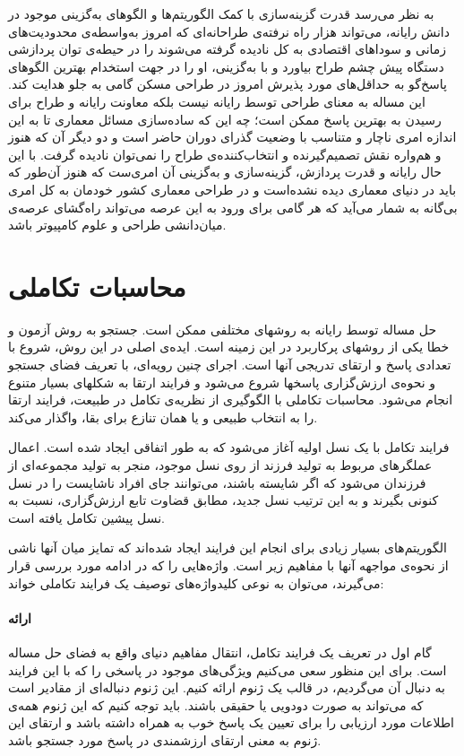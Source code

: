 \documentclass{report}
\begin{document}
به نظر می‌رسد قدرت گزینه‌سازی با کمک الگوریتم‌ها و الگوهای به‌گزینی موجود در دانش رایانه، می‌تواند هزار راه نرفته‌ی طراحانه‌ای که امروز به‌واسطه‌ی محدودیت‌های زمانی و سوداهای اقتصادی به کل نادیده گرفته می‌شوند را در حیطه‌ی توان پردازشی دستگاه پیش چشم طراح بیاورد و با به‌گزینی، او را در جهت استخدام بهترین الگوهای پاسخ‌گو به حداقل‌های مورد پذیرش امروز در طراحی مسکن گامی به جلو هدایت کند. این مساله به معنای طراحی توسط رایانه نیست بلکه معاونت رایانه و طراح برای رسیدن به بهترین پاسخ ممکن است؛ چه این که ساده‌سازی مسائل معماری تا به این اندازه امری ناچار و متناسب با وضعیت گذرای دوران حاضر است و دو دیگر آن که هنوز و هم‌واره نقش تصمیم‌گیرنده و انتخاب‌کننده‌ی طراح را نمی‌توان نادیده گرفت. با این حال رایانه و قدرت پردازش، گزینه‌سازی و به‌گزینی آن امری‌ست که هنوز آن‌طور که باید در دنیای معماری دیده نشده‌است و در طراحی معماری کشور خودمان به کل امری بی‌گانه به شمار می‌آید که هر گامی برای ورود به این عرصه می‌تواند راه‌گشای عرصه‌ی میان‌دانشی طراحی و علوم کامپیوتر باشد.

\section{محاسبات تکاملی}
حل مساله توسط رایانه به روشهای مختلفی ممکن است. جستجو به روش آزمون و خطا یکی از روشهای پرکاربرد در این زمینه است. ایده‌ی اصلی در این روش، شروع با تعدادی پاسخ و ارتقای تدریجی آنها است. اجرای چنین رویه‌ای، با تعریف فضای جستجو و نحوه‌ی ارزش‌گزاری پاسخها شروع می‌شود و فرایند ارتقا به شکلهای بسیار متنوع انجام می‌شود. محاسبات تکاملی با الگوگیری از نظریه‌ی تکامل در طبیعت، فرایند ارتقا را به انتخاب طبیعی و یا همان تنازع برای بقا، واگذار می‌کند.

فرایند تکامل با یک نسل اولیه آغاز می‌شود که به طور اتفاقی ایجاد شده است. اعمال عملگرهای مربوط به تولید فرزند از روی نسل موجود، منجر به تولید مجموعه‌ای از فرزندان می‌شود که اگر شایسته باشند، می‌توانند جای افراد ناشایست را در نسل کنونی بگیرند و به این ترتیب نسل جدید، مطابق قضاوت تابع ارزش‌گزاری، نسبت به نسل پیشین تکامل یافته است.

الگوریتم‌های بسیار زیادی برای انجام این فرایند ایجاد شده‌اند که تمایز میان آنها ناشی از نحوه‌ی مواجهه آنها با مفاهیم زیر است. واژه‌هایی را که در ادامه مورد بررسی قرار می‌گیرند، می‌توان به نوعی کلیدواژه‌های توصیف یک فرایند تکاملی خواند:

\paragraph{ارائه}
گام اول در تعریف یک فرایند تکامل، انتقال مفاهیم دنیای واقع به فضای حل مساله است. برای این منظور سعی می‌کنیم ویژگی‌های موجود در پاسخی را که با این فرایند به دنبال آن می‌گردیم، در قالب یک ژنوم ارائه کنیم. این ژنوم دنباله‌ای از مقادیر است که می‌تواند به صورت دودویی یا حقیقی باشند. باید توجه کنیم که این ژنوم همه‌ی اطلاعات مورد ارزیابی را برای تعیین یک پاسخ خوب به همراه داشته باشد و ارتقای این ژنوم به معنی ارتقای ارزشمندی در پاسخ مورد جستجو باشد.
\end{document}

